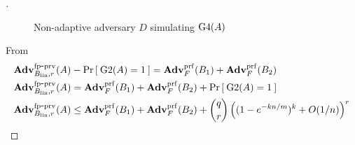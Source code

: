 \begin{proof}[]

\begin{figure}
\centering
{}
\caption{Non-adaptive adversary $D$ simulating $\text{G4}(A)$} \label{fig:D}
\end{figure}	

From  \\
\begin{align}
\nonumber \mathrm{\mathbf{Adv}}^{\mathrm{fp\mbox{-}prv}}_{B_{\mathrm{lin}},r}(A) &- \Pr\left[\: \text{G2}(A)=1 \:\right] =  \mathbf{Adv}^{\mathrm{prf}}_{F}(B_1) + \mathbf{Adv}^{\mathrm{prf}}_{F}(B_2)   \\
\nonumber \mathrm{\mathbf{Adv}}^{\mathrm{fp\mbox{-}prv}}_{B_{\mathrm{lin}},r}(A)  &=  \mathbf{Adv}^{\mathrm{prf}}_{F}(B_1) + \mathbf{Adv}^{\mathrm{prf}}_{F}(B_2) + \Pr\left[\: \text{G2}(A)=1 \:\right]  \\
\mathrm{\mathbf{Adv}}^{\mathrm{fp\mbox{-}prv}}_{B_{\mathrm{lin}},r}(A) &\leq  \mathbf{Adv}^{\mathrm{prf}}_{F}(B_1) +
\mathbf{Adv}^{\mathrm{prf}}_{F}(B_2)  +{\dbinom{q}{r}} \left( (1-e^{-kn/m})^k + O(1/n) \right)^r
\end{align}


\end{proof}
